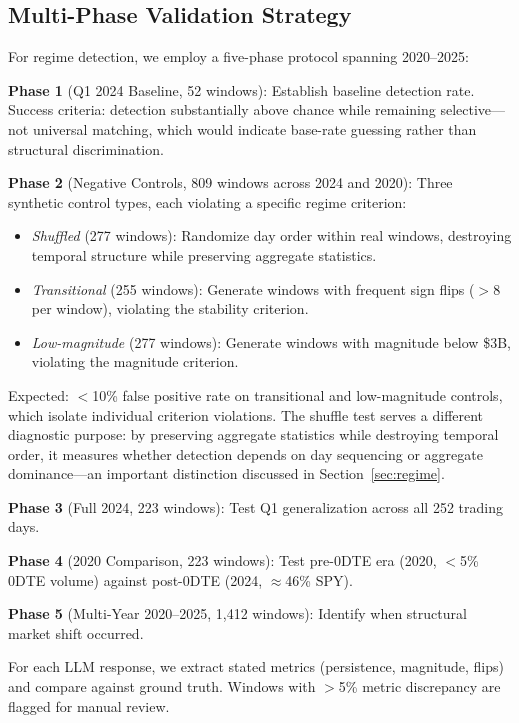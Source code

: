 \subsection{Multi-Phase Validation Strategy}

For regime detection, we employ a five-phase protocol spanning 2020--2025:

\textbf{Phase 1} (Q1 2024 Baseline, 52 windows): Establish baseline detection rate. Success criteria: detection substantially above chance while remaining selective---not universal matching, which would indicate base-rate guessing rather than structural discrimination.

\textbf{Phase 2} (Negative Controls, 809 windows across 2024 and 2020): Three synthetic control types, each violating a specific regime criterion:
\begin{itemize}
    \item \textit{Shuffled} (277 windows): Randomize day order within real windows, destroying temporal structure while preserving aggregate statistics.
    \item \textit{Transitional} (255 windows): Generate windows with frequent sign flips ($>$8 per window), violating the stability criterion.
    \item \textit{Low-magnitude} (277 windows): Generate windows with magnitude below \$3B, violating the magnitude criterion.
\end{itemize}
Expected: $<$10\% false positive rate on transitional and low-magnitude controls, which isolate individual criterion violations. The shuffle test serves a different diagnostic purpose: by preserving aggregate statistics while destroying temporal order, it measures whether detection depends on day sequencing or aggregate dominance---an important distinction discussed in Section~\ref{sec:regime}.

\textbf{Phase 3} (Full 2024, 223 windows): Test Q1 generalization across all 252 trading days.

\textbf{Phase 4} (2020 Comparison, 223 windows): Test pre-0DTE era (2020, $<$5\% 0DTE volume) against post-0DTE (2024, $\approx$46\% SPY).

\textbf{Phase 5} (Multi-Year 2020--2025, 1,412 windows): Identify when structural market shift occurred.

For each LLM response, we extract stated metrics (persistence, magnitude, flips) and compare against ground truth. Windows with $>$5\% metric discrepancy are flagged for manual review.

